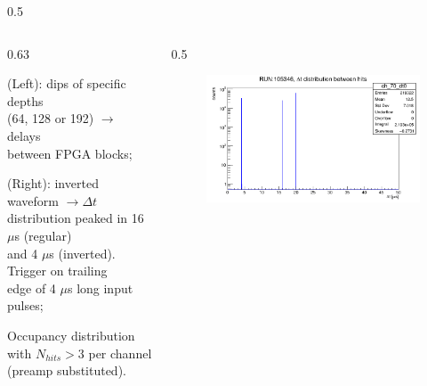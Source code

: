 \documentclass{beamer}
\begin{document}
\begin{frame}
\begin{columns}
\begin{column}{0.5\framewidth}
\begin{figure}[!h]
     \label{fig:normalhits}
\end{figure}
\end{column}
\end{columns}
\vspace{-1.5mm}
    \begin{columns}
    \begin{column}{0.63\framewidth}
        \setlength{\leftmargini}{1.1em}
      \begin{itemize}
 {\footnotesize
 \item (Left): dips of specific depths 
 \\ (64, 128 or 192) $\rightarrow$ delays 
 \\ between FPGA blocks;
\item (Right): inverted waveform $\rightarrow \Delta t $ distribution peaked in 16 $\mu$s (regular) \\ and 4 $\mu$s (inverted). Trigger on trailing \\ edge of 4 $\mu$s long input pulses;
\item Occupancy distribution with $N_{hits}> 3$ per channel (preamp substituted).}

\end{itemize}
\end{column}
\begin{column}{0.5\framewidth}
         \begin{figure}[!h]
      \centering
      \hspace*{-2em}
      \includegraphics[width=\columnwidth]{figures/png/deltathits.png}
     \label{fig:normalhits}
\end{figure}
\end{column}
\end{columns}
\end{frame}
\end{document}
